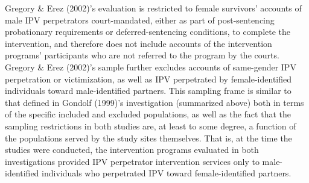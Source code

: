 \documentclass[11pt,]{tufte-book}
\begin{document}
Gregory \& Erez (2002)'s evaluation is restricted to female survivors'
accounts of male IPV perpetrators court-mandated, either as part of
post-sentencing probationary requirements or deferred-sentencing
conditions, to complete the intervention, and therefore does not include
accounts of the intervention programs' participants who are not referred
to the program by the courts. Gregory \& Erez (2002)'s sample further
excludes accounts of same-gender IPV perpetration or victimization, as
well as IPV perpetrated by female-identified individuals toward
male-identified partners. This sampling frame is similar to that defined
in Gondolf (1999)'s investigation (summarized above) both in terms of
the specific included and excluded populations, as well as the fact that
the sampling restrictions in both studies are, at least to some degree,
a function of the populations served by the study sites themselves. That
is, at the time the studies were conducted, the intervention programs
evaluated in both investigations provided IPV perpetrator intervention
services only to male-identified individuals who perpetrated IPV toward
female-identified partners.
\end{document}
